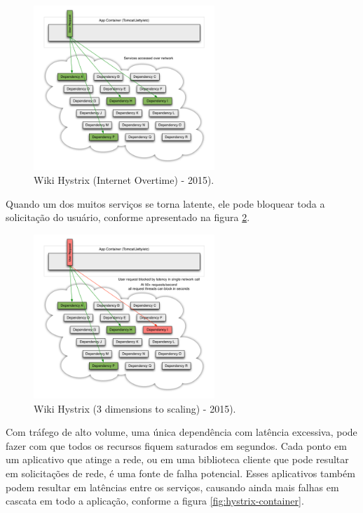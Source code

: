 \documentclass[journal]{IEEEtran}
\begin{document}
\begin{figure}[h]
\centering
\includegraphics[height=6.2cm]{figura3}
\caption{Wiki Hystrix (Internet Overtime) - 2015).}
\label{fig:hystrix-overtime}
\end{figure}

Quando um dos muitos serviços se torna latente, ele pode bloquear toda a solicitação do usuário, conforme apresentado na figura \ref{fig:hystrix-dimensions-scaling}.

\begin{figure}[h]
\centering
\includegraphics[height=6.2cm]{figura4}
\caption{Wiki Hystrix (3 dimensions to scaling) - 2015).}
\label{fig:hystrix-dimensions-scaling}
\end{figure}

Com tráfego de alto volume, uma única dependência com latência excessiva, pode fazer com que todos os recursos fiquem saturados em segundos. Cada ponto em um aplicativo que atinge a rede, ou em uma biblioteca cliente que pode resultar em solicitações de rede, é uma fonte de falha potencial. Esses aplicativos também podem resultar em latências entre os serviços, causando ainda mais falhas em cascata em todo a aplicação, conforme a figura \ref{fig:hystrix-container}.
\end{document}
